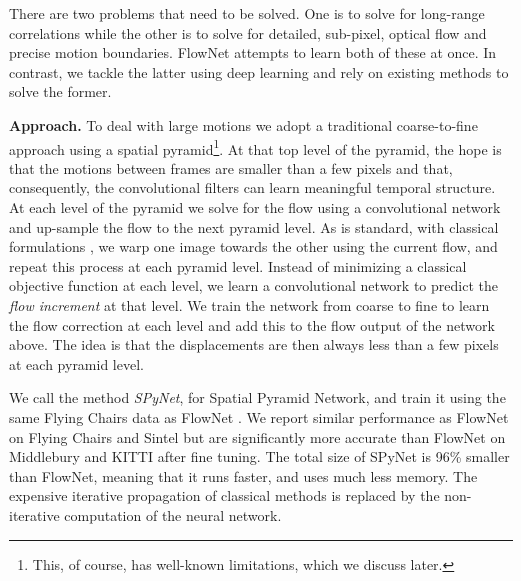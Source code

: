 \documentclass[10pt,twocolumn,letterpaper]{article}
\begin{document}
There are two problems that need to be solved.
One is to solve for long-range correlations while the other is to solve for detailed, sub-pixel, optical flow and precise motion boundaries.
FlowNet \cite{dosovitskiy2015flownet} attempts to learn both of these at once.
In contrast, we tackle the latter using deep learning and rely on existing methods to solve the former.

{\bf Approach.}
To deal with large motions we adopt a traditional coarse-to-fine approach using a spatial pyramid\footnote{This, of course, has well-known limitations, which we discuss later.}.
At that top level of the pyramid, the hope is that the motions between frames are smaller than a few pixels and that, consequently, the convolutional filters can learn meaningful temporal structure.
At each level of the pyramid we solve for the flow using a convolutional network and
up-sample the flow to the next pyramid level.
As is standard, with classical formulations \cite{sun2014quantitative},
we warp one image towards the other using the current flow, and repeat this process at each pyramid level.
Instead of minimizing a classical objective function at each level, we learn a convolutional network to predict the {\em flow increment} at that level.
We train the network from coarse to fine to learn the flow correction at each level and add this to the flow output of the network above.
The idea is that the displacements are then always less than a few pixels at each pyramid level.

We call the method {\em SPyNet}, for Spatial Pyramid Network, and train it using the same Flying Chairs data as FlowNet \cite{dosovitskiy2015flownet}.
We report similar performance as FlowNet on Flying Chairs and Sintel \cite{Butler:ECCV:2012} but are  %
significantly more accurate than FlowNet on Middlebury \cite{baker2011database} and KITTI \cite{Geiger2012CVPR} after fine tuning.
The total size of SPyNet is 96\% smaller than FlowNet, meaning that it runs faster, and uses much less memory.
%
The expensive iterative propagation of classical methods is replaced by the non-iterative computation of the neural network.
\end{document}
